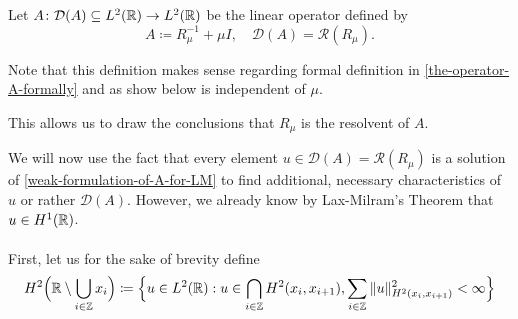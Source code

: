 \begin{definition}
	Let $A \colon \mathcal{D}(A) \subseteq L^{2}(\mathbb{R}) \rightarrow L^{2}(\mathbb{R})$ be the linear operator defined by
	\[ A \coloneqq R_{\mu}^{-1} + \mu I, \quad \mathcal{D}(A) = \mathcal{R}(R_{\mu}). \]
\end{definition}

Note that this definition makes sense regarding formal definition in \eqref{the-operator-A-formally} and as show below is independent of $\mu$. %

\begin{remark}
	This allows us to draw the conclusions that $R_{\mu}$ is the resolvent of $A$.
\end{remark}

We will now use the fact that every element $u \in \mathcal{D}(A) = \mathcal{R}(R_{\mu})$ is a solution of \eqref{weak-formulation-of-A-for-LM} to find additional, necessary  characteristics of $u$ or rather $\mathcal{D}(A)$. However, we already know by Lax-Milram's Theorem that $u \in H^{1}(\mathbb{R})$.
~\\ ~\\
First, let us for the sake of brevity define
\[ H^{2}\Big(\mathbb{R} \setminus \bigcup_{i \in \mathbb{Z}} x_{i} \Big) \coloneqq \Big\{ u \in L^{2}(\mathbb{R}) : u \in \bigcap_{i \in \mathbb{Z}} H^{2}(x_{i}, x_{i+1}), \sum_{i \in \mathbb{Z}} \|u\|^{2}_{H^{2}(x_{i}, x_{i+1})} < \infty \Big\} \]

